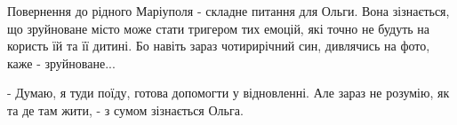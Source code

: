 Повернення до рідного Маріуполя - складне питання для Ольги. Вона зізнається,
що зруйноване місто може стати тригером тих емоцій, які точно не будуть на
користь їй та її дитині. Бо навіть зараз чотирирічний син, дивлячись на фото,
каже - зруйноване...  

- Думаю, я туди поїду, готова допомогти у відновленні. Але зараз не розумію, як
та де там жити, - з сумом зізнається Ольга. 

